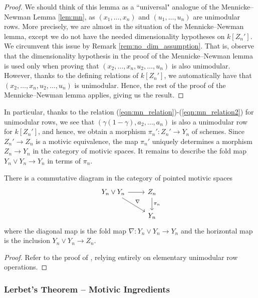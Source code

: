\begin{proof}
    We should think of this lemma as a ``universal" analogue of the Mennicke--Newman Lemma \ref{lem:mn}, as $(x_1,\ldots,x_n)$ and $(u_1,\ldots,u_n)$ are unimodular rows. More precisely, we are almost in the situation of the Mennicke--Newman lemma, except we do not have the needed dimensionality hypotheses on $k[Z_n']$. We circumvent this issue by Remark \ref{rem:no_dim_assumption}. That is, observe that the dimensionality hypothesis in the proof of the Mennicke--Newman lemma is used only when proving that $(x_2,\ldots,x_n,u_2,\ldots,u_n)$ is also unimodular. However, thanks to the defining relations of $k[Z_n']$, we automatically have that $(x_2,\ldots,x_n,u_2,\ldots,u_n)$ is unimodular. Hence, the rest of the proof of the Mennicke--Newman lemma applies, giving us the result.
\end{proof}

In particular, thanks to the relation (\ref{eqn:mn_relation})-(\ref{eqn:mn_relation2}) for unimodular rows, we see that $(\gamma(1-\gamma),a_2,\ldots,a_n)$ is also a unimodular row for $k[Z_n']$, and hence, we obtain a morphism $\pi_n': Z_n' \to Y_n$ of schemes. Since $Z_n' \to Z_n$ is a motivic equivalence, the map $\pi_n'$ uniquely determines a morphism $Z_n \to Y_n$ in the category of motivic spaces. It remains to describe the fold map $Y_n \vee Y_n \to Y_n$ in terms of $\pi_n$. 

\begin{proposition}\cite[Lemma 5.8]{LERBET2024109415}\label{prop:big_upshot}
    There is a commutative diagram in the category of pointed motivic spaces
\[\begin{tikzcd}
	{Y_n \vee Y_n} & {Z_n} \\
	& {Y_n}
	\arrow[from=1-1, to=1-2]
	\arrow[from=1-1, to=2-2, "{\nabla}"]
	\arrow["{\pi_n}", from=1-2, to=2-2]
\end{tikzcd}\]
where the diagonal map is the fold map $\nabla: Y_n \vee Y_n \to Y_n$ and the horizontal map is the inclusion $Y_n \vee Y_n \to Z_n$.
\end{proposition}

\begin{proof}
    Refer to the proof of \cite[Lemma 5.8]{LERBET2024109415}, relying entirely on elementary unimodular row operations.
\end{proof} 

\subsubsection{Lerbet's Theorem -- Motivic Ingredients}\label{subsec:lerbet_motivic}

